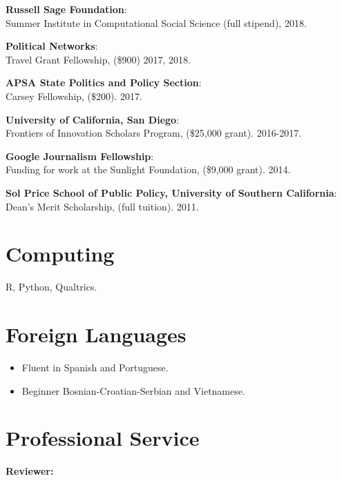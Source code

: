 \documentclass[margin,line]{res}
\newenvironment{list1}{
  \begin{list}{\ding{113}}{%
      \setlength{\itemsep}{0in}
      \setlength{\parsep}{0in} \setlength{\parskip}{0in}
      \setlength{\topsep}{0in} \setlength{\partopsep}{0in} 
      \setlength{\leftmargin}{0.17in}}}{\end{list}}
\begin{document}
\begin{resume}
{\bf Russell Sage Foundation}:\\ Summer Institute in Computational Social Science (full stipend),  2018.

{\bf Political Networks}:\\ Travel Grant Fellowship, (\$900) 2017, 2018.

{\bf APSA State Politics and Policy Section}:\\ Carsey Fellowship, (\$200). 2017. 

{\bf University of California, San Diego}:\\
Frontiers of Innovation Scholars Program, (\$25,000 grant). 2016-2017. 

{\bf Google Journalism Fellowship}:\\
Funding for work at the Sunlight Foundation, (\$9,000 grant). 2014.

{\bf Sol Price School of Public Policy, University of Southern California}:\\ Dean's Merit Scholarship, (full tuition). 2011.


\section{\sc Computing} 
\begin{list1}
\item[] R, Python, Qualtrics.
\end{list1}

\section{\sc Foreign Languages} 
\begin{itemize}
\item Fluent in Spanish and Portuguese.
\item Beginner Bosnian-Croatian-Serbian and Vietnamese.
\end{itemize}

\section{\sc Professional Service}
{\bf Reviewer:}


\end{resume}
\end{document}
